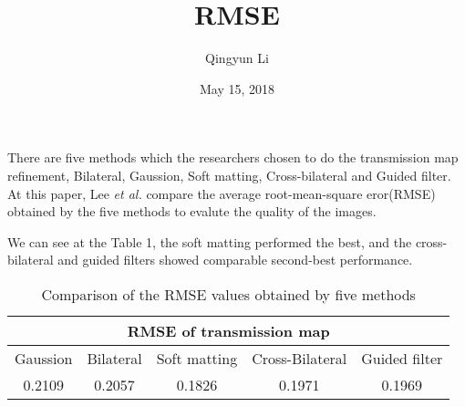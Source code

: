 \documentclass{article}
\author{Qingyun Li}
\date{May 15, 2018}
\title{RMSE}
\begin{document}
\maketitle
 \par There are five methods which the researchers chosen to do the transmission map refinement\cite{Lee2016A}, Bilateral, Gaussion, Soft matting, Cross-bilateral and Guided filter. At this paper, Lee \emph{et al.}\cite{Lee2016A} compare the average root-mean-square eror(RMSE) obtained by the five methods to evalute the quality of the images.
 \par We can see at the Table 1, the soft matting performed the best, and the cross-bilateral and guided filters showed comparable second-best performance.
\begin{table}[htbp]
\centering
\caption{Comparison of the RMSE values obtained by five methods}
\begin{tabular}{|c|c|c|c|c|}
\hline
\multicolumn{5}{|c|}{RMSE of transmission map} \\
\hline 
Gaussion & Bilateral & Soft matting & Cross-Bilateral & Guided filter \\
\hline 
0.2109 & 0.2057 & 0.1826 & 0.1971 & 0.1969 \\
\hline 
\end{tabular} 
\end{table}


\end{document}
